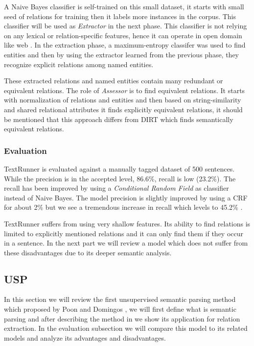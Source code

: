    
    
    A Naive Bayes classifier is self-trained on this small dataset, it 
   starts with small seed of relations for training then it labels more instances in the corpus. This classifier will be used as
    \emph{Extractor}
   in the next phase. This classifier is not relying on any lexical or relation-specific features, hence it can operate 
   in open domain like web \cite{Banko2009}. In the extraction phase, a maximum-entropy classifer was used to find entities and then by 
   using the extractor learned from the previous phase, they recognize explicit relations among named entities.
   
   These extracted relations and named entities contain many redundant or equivalent relations. The role of \emph{Assessor}
    is to find equivalent relations. It starts with normalization of relations and entities and then based on string-similarity
     and shared relational attributes it finds explicitly equivalent relations, it should be mentioned that 
     this approach differs from DIRT which finds semantically equivalent relations.
     
      
     
\subsubsection{Evaluation}
\label{ssec:textrunner-eval}
     
     TextRunner is evaluated against a manually tagged dataset of 500 sentences. While the precision is in 
      the accepted level, 86.6\%, recall is low (23.2\%). The recall has been improved by using a \emph{Conditional Random Field}
       \cite{Banko2009} as classifier instead of Naive Bayes. The model precision is slightly improved by using a CRF for about 2\%
        but we see a tremendous increase in recall which levels to 45.2\% . 
 
TextRunner suffers from using very shallow features. Its ability to find relations is limited to explicitly mentioned
 relations and it can only find them if they occur in a sentence. In the next part we will review a model 
 which does not suffer from these disadvantages due to its deeper semantic analysis. 
 

\subsection{USP}
\label{ssec:usp}

In this section we will review the first unsupervised semantic parsing method which proposed by Poon and Domingos \cite{Poon2009},
we will first define what is semantic parsing and after describing the method in \cite{Poon2009} we show its application for relation extraction.
In the evaluation subsection we will compare this model to its related models and analyze its advantages and disadvantages.

